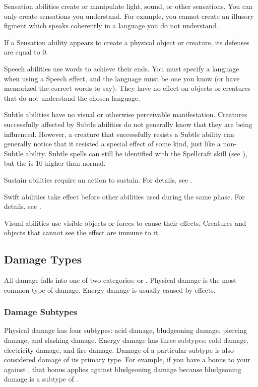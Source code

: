          Sensation abilities create or manipulate light, sound, or other sensations.
        You can only create sensations you understand.
        For example, you cannot create an illusory figment which speaks coherently in a language you do not understand.
        \par If a Sensation ability appears to create a physical object or creature, its defenses are equal to 0.

         Speech abilities use words to achieve their ends.
        You must specify a language when using a Speech effect, and the language must be one you know (or have memorized the correct words to say). They have no effect on objects or creatures that do not understand the chosen language.

         Subtle abilities have no visual or otherwise perceivable manifestation.
        Creatures successfully affected by Subtle abilities do not generally know that they are being influenced.
        However, a creature that successfully resists a Subtle ability can generally notice that it resisted a special effect of some kind, just like a non-Subtle ability.
        Subtle spells can still be identified with the Spellcraft skill (see ), but the  is 10 higher than normal.

         Sustain abilities require an action to sustain. For details, see .

         Swift abilities take effect before other abilities used during the same phase.
        For details, see .

         Visual abilities use visible objects or forces to cause their effects.
        Creatures and objects that cannot see the effect are immune to it.

    \subsection{Damage Types}\label{Damage Types}
        All damage falls into one of two categories:  or .
        Physical damage is the most common type of damage.
        Energy damage is usually caused by  effects.

        \subsubsection{Damage Subtypes}\label{Damage Subtypes}
            Physical damage has four subtypes: acid damage, bludgeoning damage, piercing damage, and slashing damage.
            Energy damage has three subtypes: cold damage, electricity damage, and fire damage.
            Damage of a particular subtype is also considered damage of its primary type.
            For example, if you have a bonus to your  against , that bonus applies against bludgeoning damage because bludgeoning damage is a subtype of .

